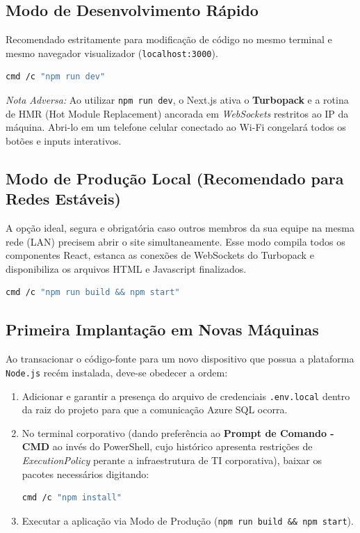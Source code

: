 \documentclass[12pt,a4paper]{article}
\begin{document}
\subsection{Modo de Desenvolvimento Rápido}
Recomendado estritamente para modificação de código no mesmo terminal e mesmo navegador visualizador (\texttt{localhost:3000}).
\begin{lstlisting}[language=bash]
cmd /c "npm run dev"
\end{lstlisting}
\textit{Nota Adversa:} Ao utilizar \texttt{npm run dev}, o Next.js ativa o \textbf{Turbopack} e a rotina de HMR (Hot Module Replacement) ancorada em \textit{WebSockets} restritos ao IP da máquina. Abri-lo em um telefone celular conectado ao Wi-Fi congelará todos os botões e inputs interativos.

\subsection{Modo de Produção Local (Recomendado para Redes Estáveis)}
A opção ideal, segura e obrigatória caso outros membros da sua equipe na mesma rede (LAN) precisem abrir o site simultaneamente. Esse modo compila todos os componentes React, estanca as conexões de WebSockets do Turbopack e disponibiliza os arquivos HTML e Javascript finalizados.
\begin{lstlisting}[language=bash]
cmd /c "npm run build && npm start"
\end{lstlisting}

\subsection{Primeira Implantação em Novas Máquinas}
Ao transacionar o código-fonte para um novo dispositivo que possua a plataforma \texttt{Node.js} recém instalada, deve-se obedecer a ordem:
\begin{enumerate}
    \item Adicionar e garantir a presença do arquivo de credenciais \texttt{.env.local} dentro da raiz do projeto para que a comunicação Azure SQL ocorra.
    \item No terminal corporativo (dando preferência ao \textbf{Prompt de Comando - CMD} ao invés do PowerShell, cujo histórico apresenta restrições de \textit{ExecutionPolicy} perante a infraestrutura de TI corporativa), baixar os pacotes necessários digitando:
    \begin{lstlisting}[language=bash]
    cmd /c "npm install"
    \end{lstlisting}
    \item Executar a aplicação via Modo de Produção (\texttt{npm run build \&\& npm start}).
\end{enumerate}
\end{document}
